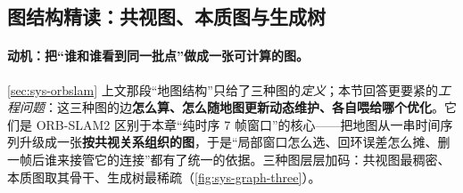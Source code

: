 \subsection{图结构精读：共视图、本质图与生成树}
\label{sec:sys-graph}

\paragraph{动机：把“谁和谁看到同一批点”做成一张可计算的图。}
\cref{sec:sys-orbslam} 上文那段“地图结构”只给了三种图的\emph{定义}；本节回答更要紧的\emph{工程问题}：这三种图的边\textbf{怎么算、怎么随地图更新动态维护、各自喂给哪个优化}。它们是 ORB-SLAM2 区别于本章“纯时序 7 帧窗口”的核心——把地图从一串时间序列升级成一张\textbf{按共视关系组织的图}，于是“局部窗口怎么选、回环误差怎么摊、删一帧后谁来接管它的连接”都有了统一的依据。三种图层层加码：共视图最稠密、本质图取其骨干、生成树最稀疏（\cref{fig:sys-graph-three}）。


